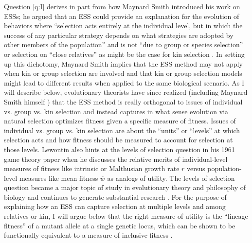 \documentclass[11pt]{article}
\newcommand{\mean}[1]{\overline{#1}}
\begin{document}
Question \ref{q:I} derives in part from how Maynard Smith introduced his work on ESSs; he argued that an ESS could provide an explanation for the evolution of behaviors where ``selection acts entirely at the individual level, but in which the success of any particular strategy depends on what strategies are adopted by other members of the population'' \cite[][p. 210]{Maynard-Smith:1974} and is not ``due to group or species selection'' \cite[p. 15]{Maynard-Smith:Price:1973} or selection on ``close relatives'' \cite[p. 210]{Maynard-Smith:1974} as might be the case for kin selection \cite{Hamilton:1964}. In setting up this dichotomy, Maynard Smith implies that the ESS method may not apply when kin or group selection are involved and that kin or group selection models might lead to different results when applied to the same biological scenario. As I will describe below, evolutionary theorists have since realized (including Maynard Smith himself \cite[p. 33]{MaynardSmith:1978}) that the ESS method is really orthogonal to issues of individual vs. group vs. kin selection and instead captures in what sense evolution via natural selection optimizes fitness given a specific measure of fitness. Issues of individual vs. group vs. kin selection are about the ``units'' or ``levels'' at which selection acts and how fitness should be measured to account for selection at those levels. Lewontin also hints at the levels of selection question in his 1961 game theory paper when he discusses the relative merits of individual-level measures of fitness like intrinsic or Malthusian growth rate $r$ versus population-level measures like mean fitness $\mean{w}$ \cite[p. 400-401]{Lewontin:1961} as analogs of utility. The levels of selection question became a major topic of study in evolutionary theory \cite[e.g.,][]{Lewontin:1970,Dawkins:1982,Wilson:Sober:1989,Maynard-Smith:Szathmary:1995,Wilson:1997,Michod:1999,Michod:2006,Szathmary:2015} and philosophy of biology \cite{Hull:1980,Brandon:1982,Damuth:Heisler:1988,Lloyd:1992,Lloyd:1994,Sober:Wilson:1994,Okasha:2006,Okasha:2016} and continues to generate substantial research \cite[e.g.,][]{Black:Bourrat:2020,Cooney:Mori:2022,Veit:2022}. For the purpose of explaining how an ESS can capture selection at multiple levels and among relatives or kin, I will argue below that the right measure of utility is the ``lineage fitness'' \cite{Lehmann:Alger:2015,Akcay:Van-Cleve:2016,Lehmann:Mullon:2016} of a mutant allele at a single genetic locus, which can be shown to be functionally equivalent to a measure of inclusive fitness \cite{Lehmann:Mullon:2016,Lehmann:Rousset:2020}.
\end{document}
